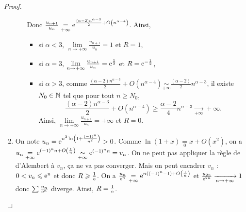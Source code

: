 \documentclass[12pt]{article}
\begin{document}
\begin{proof}
\begin{enumerate}
\begin{itemize}
            Donc $\frac{u_{n+1}}{u_{n}}\underset{+\infty}{=}\mathrm{e}^{\frac{(\alpha-2)n^{\alpha-3}}{2}+O\left(n^{\alpha-4}\right)}$.
            Ainsi,
            \begin{itemize}
                \item si $\alpha<3$, $\lim\limits_{n\to+\infty}\frac{u_{n+1}}{u_{n}}=1$ et $R=1$,
                \item si $\alpha=3$, $\lim\limits_{n\to+\infty}\frac{u_{n+1}}{u_{n}}=\mathrm{e}^{\frac{1}{2}}$ et $R=\mathrm{e}^{-\frac{1}{2}}$,
                \item si $\alpha>3$, comme $\frac{(\alpha-2)n^{\alpha-3}}{2}+O\left(n^{\alpha-4}\right)\underset{+\infty}{\sim}\frac{(\alpha-2)}{2}n^{\alpha-3}$, il existe $N_{0}\in\mathbb{N}$ tel que pour tout $n\geqslant N_{0}$,
                \begin{equation}
                    \frac{(\alpha-2)n^{\alpha-3}}{2}+O\left(n^{\alpha-4}\right)\geqslant \frac{\alpha-2}{4}n^{\alpha-3}\xrightarrow[+\infty]{}+\infty.
                \end{equation}
                Ainsi, $\lim\limits_{n\to+\infty}\frac{u_{n+1}}{u_{n}}=+\infty$ et $R=0$.
            \end{itemize}
        \end{itemize}

        \item On note $u_n=\mathrm{e}^{n^{2}\ln\left(1+\frac{(-1)^{n}}{n^{2}}\right)}>0$. Comme $\ln(1+x)\underset{0}{=}x+O(x^{2})$, on a $u_n\underset{+\infty}{=}\mathrm{e}^{(-1)^{n}n+O\left(\frac{1}{n}\right)}\underset{+\infty}{\sim}\mathrm{e}^{(-1)^{n}n}=v_n$. On ne peut pas appliquer la règle de d'Alembert à $v_n$, ça ne va pas converger. Mais on peut encadrer $v_n$ : $0<v_n\leqslant\mathrm{e}^{n}$ et donc $R\geqslant\frac{1}{\mathrm{e}}$. On a $\frac{u_n}{\mathrm{e}^{n}}\underset{+\infty}{=}\mathrm{e}^{n\left((-1)^{n}-1\right)+O\left(\frac{1}{n}\right)}$ et $\frac{u_{2n}}{\mathrm{e}^{2n}}\xrightarrow[n\to+\infty]{}1$ donc $\sum \frac{u_{n}}{\mathrm{e}^{n}}$ diverge. Ainsi, $R=\frac{1}{\mathrm{e}}$.
    \end{enumerate}
\end{proof}
\end{document}
